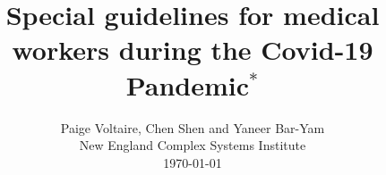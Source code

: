 \documentclass[onecolumn,journal]{IEEEtran}
\begin{document}
\title{\color{Brown} Special guidelines for medical workers during the Covid-19 Pandemic$^*$ \\
\vspace{-0.35ex}}
\author{Paige Voltaire, Chen Shen and Yaneer Bar-Yam \\ New England Complex Systems Institute \\
 \today 
  \vspace{-14ex} \\ 

   
\bigskip
\bigskip

\textbf{}
 }
    
\maketitle


\flushbottom %



\thispagestyle{empty} %




\end{document}
